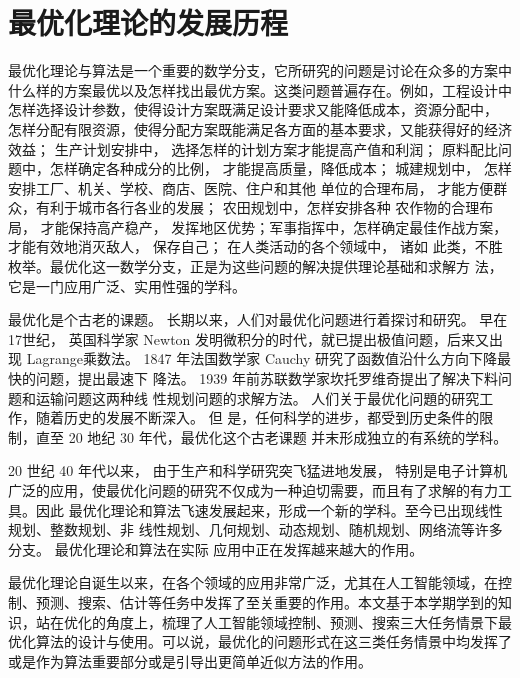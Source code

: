 \chapter{最优化理论的发展历程}
\cite{陈宝林2005最优化理论与算法}最优化理论与算法是一个重要的数学分支，它所研究的问题是讨论在众多的方案中什么样的方案最优以及怎样找出最优方案。这类问题普遍存在。例如，工程设计中怎样选择设计参数，使得设计方案既满足设计要求又能降低成本，资源分配中， 怎样分配有限资源，使得分配方案既能满足各方面的基本要求，又能获得好的经济效益； 生产计划安排中， 选择怎样的计划方案才能提高产值和利润； 原料配比问题中，怎样确定各种成分的比例， 才能提高质量，降低成本； 城建规划中， 怎样安排工厂、机关、学校、商店、医院、住户和其他 单位的合理布局， 才能方便群众，有利于城市各行各业的发展； 农田规划中，怎样安排各种 农作物的合理布局， 才能保持高产稳产， 发挥地区优势；军事指挥中，怎样确定最佳作战方案，才能有效地消灭敌人， 保存自己； 在人类活动的各个领域中， 诸如 此类，不胜枚举。最优化这一数学分支，正是为这些问题的解决提供理论基础和求解方 法，它是一门应用广泛、实用性强的学科。

最优化是个古老的课题。 长期以来，人们对最优化问题进行着探讨和研究。 早在 17世纪， 英国科学家 Newton 发明微积分的时代，就已提出极值问题，后来又出现 Lagrange乘数法。 1847 年法国数学家 Cauchy 研究了函数值沿什么方向下降最快的问题，提出最速下 降法。 1939 年前苏联数学家坎托罗维奇提出了解决下料问题和运输问题这两种线 性规划问题的求解方法。 人们关于最优化问題的研究工作，随着历史的发展不断深入。 但 是，任何科学的进步，都受到历史条件的限制，直至 20 地纪 30 年代，最优化这个古老课题 并末形成独立的有系统的学科。

20 世纪 40 年代以来， 由于生产和科学研究突飞猛进地发展， 特别是电子计算机广泛的应用，使最优化问题的研究不仅成为一种迫切需要，而且有了求解的有力工具。因此 最优化理论和算法飞速发展起来，形成一个新的学科。至今已出现线性规划、整数规划、非 线性规划、几何规划、动态规划、随机规划、网络流等许多分支。 最优化理论和算法在实际 应用中正在发挥越来越大的作用。

最优化理论自诞生以来，在各个领域的应用非常广泛，尤其在人工智能领域，在控制、预测、搜索、估计等任务中发挥了至关重要的作用。本文基于本学期学到的知识，站在优化的角度上，梳理了人工智能领域控制、预测、搜索三大任务情景下最优化算法的设计与使用。可以说，最优化的问题形式在这三类任务情景中均发挥了或是作为算法重要部分或是引导出更简单近似方法的作用。
